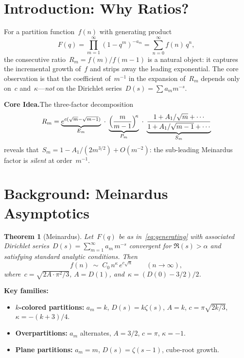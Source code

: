\documentclass[11pt,a4paper]{article}
\newtheorem{theorem}{Theorem}[section]
\begin{document}
\tableofcontents

\section{Introduction: Why Ratios?}\label{sec:intro}

For a partition function~$f(n)$ with generating product
\begin{equation}\label{eq:generating}
  F(q) = \prod_{m=1}^{\infty}(1-q^m)^{-a_m} = \sum_{n=0}^{\infty} f(n)\,q^n,
\end{equation}
the consecutive ratio~$R_m = f(m)/f(m-1)$ is a natural object: it captures the incremental growth of~$f$ and strips away the leading exponential. The core observation is that the coefficient of~$m^{-1}$ in the expansion of~$R_m$ depends only on~$c$ and~$\kappa$---\emph{not} on the Dirichlet series~$D(s) = \sum a_m m^{-s}$.

\medskip
\noindent\textbf{Core Idea.}\quad The three-factor decomposition
\[
  R_m = \underbrace{e^{c(\sqrt{m}-\sqrt{m-1})}}_{E_m}\;\cdot\;
        \underbrace{\Bigl(\frac{m}{m-1}\Bigr)^{\!\kappa}}_{P_m}\;\cdot\;
        \underbrace{\frac{1 + A_1/\sqrt{m} + \cdots}{1 + A_1/\sqrt{m-1} + \cdots}}_{S_m}
\]
reveals that~$S_m = 1 - A_1/(2m^{3/2}) + O(m^{-2})$: the sub-leading Meinardus factor is \emph{silent} at order~$m^{-1}$.

\section{Background: Meinardus Asymptotics}\label{sec:background}

\begin{theorem}[Meinardus]\label{thm:meinardus}
Let~$F(q)$ be as in~\eqref{eq:generating} with associated Dirichlet series~$D(s) = \sum_{m=1}^\infty a_m\,m^{-s}$ convergent for $\Re(s) > \alpha$ and satisfying standard analytic conditions. Then
\begin{equation}\label{eq:meinardus}
  f(n) \;\sim\; C_0\,n^{\kappa}\,e^{c\sqrt{n}} \qquad (n \to \infty),
\end{equation}
where~$c = \sqrt{2A \cdot \pi^2/3}$, $A = D(1)$, and~$\kappa = (D(0) - 3/2)/2$.
\end{theorem}

\noindent\textbf{Key families:}
\begin{itemize}
  \item \textbf{$k$-colored partitions:} $a_m = k$, $D(s) = k\zeta(s)$, $A = k$, $c = \pi\sqrt{2k/3}$, $\kappa = -(k+3)/4$.
  \item \textbf{Overpartitions:} $a_m$ alternates, $A = 3/2$, $c = \pi$, $\kappa = -1$.
  \item \textbf{Plane partitions:} $a_m = m$, $D(s) = \zeta(s-1)$, cube-root growth.
\end{itemize}
\end{document}
